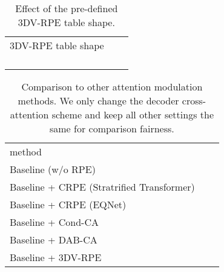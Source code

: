 \documentclass[10pt,twocolumn,letterpaper]{article}
\begin{document}
\begin{table}[t]
\begin{minipage}[t]{1\linewidth}
\vspace{2mm}
\centering
\setlength{\tabcolsep}{23pt}
\footnotesize
\renewcommand{\arraystretch}{1.2}
\resizebox{1.0\linewidth}{!}
{
\begin{tabular}{c|cc}
3DV-RPE table shape  & &  \\
\shline
 &  &          \\
\rowcolor{gray!10} &  &         \\
 &  &          \\
 &  &         \\
\end{tabular}
}
\caption{\small{{
Effect of the pre-defined 3DV-RPE table shape.}}
}
\label{tab:ablate_shape}
\end{minipage}
\end{table}
\begin{table}[t]
\begin{minipage}[t]{1\linewidth}
\centering
\setlength{\tabcolsep}{1pt}
\footnotesize
{}
\resizebox{1.0\linewidth}{!}
{
\begin{tabular}{l|c|c}
method &  &  \\
\shline
Baseline (w/o RPE) &  &  \\
Baseline + CRPE (Stratrified Transformer)  &   &  \\
Baseline + CRPE (EQNet) &   &  \\
Baseline + Cond-CA &  &  \\
Baseline + DAB-CA  &   &  \\
 \rowcolor{gray!10}Baseline + 3DV-RPE  &  &  \\
\end{tabular}
}
\caption{\small
Comparison to other attention modulation methods.
We only change the decoder cross-attention scheme and keep all other settings the same for comparison fairness.
}
\label{tab:compare_crpe}
\end{minipage}
\end{table}
\end{document}
